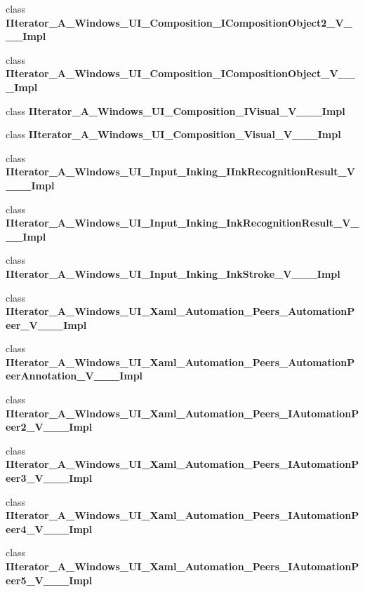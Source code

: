 \begin{DoxyCompactItemize}
\item 
class {\bfseries I\+Iterator\+\_\+\+A\+\_\+\+Windows\+\_\+\+U\+I\+\_\+\+Composition\+\_\+\+I\+Composition\+Object2\+\_\+\+V\+\_\+\+\_\+\+\_\+\+Impl}
\item 
class {\bfseries I\+Iterator\+\_\+\+A\+\_\+\+Windows\+\_\+\+U\+I\+\_\+\+Composition\+\_\+\+I\+Composition\+Object\+\_\+\+V\+\_\+\+\_\+\+\_\+\+Impl}
\item 
class {\bfseries I\+Iterator\+\_\+\+A\+\_\+\+Windows\+\_\+\+U\+I\+\_\+\+Composition\+\_\+\+I\+Visual\+\_\+\+V\+\_\+\+\_\+\+\_\+\+Impl}
\item 
class {\bfseries I\+Iterator\+\_\+\+A\+\_\+\+Windows\+\_\+\+U\+I\+\_\+\+Composition\+\_\+\+Visual\+\_\+\+V\+\_\+\+\_\+\+\_\+\+Impl}
\item 
class {\bfseries I\+Iterator\+\_\+\+A\+\_\+\+Windows\+\_\+\+U\+I\+\_\+\+Input\+\_\+\+Inking\+\_\+\+I\+Ink\+Recognition\+Result\+\_\+\+V\+\_\+\+\_\+\+\_\+\+Impl}
\item 
class {\bfseries I\+Iterator\+\_\+\+A\+\_\+\+Windows\+\_\+\+U\+I\+\_\+\+Input\+\_\+\+Inking\+\_\+\+Ink\+Recognition\+Result\+\_\+\+V\+\_\+\+\_\+\+\_\+\+Impl}
\item 
class {\bfseries I\+Iterator\+\_\+\+A\+\_\+\+Windows\+\_\+\+U\+I\+\_\+\+Input\+\_\+\+Inking\+\_\+\+Ink\+Stroke\+\_\+\+V\+\_\+\+\_\+\+\_\+\+Impl}
\item 
class {\bfseries I\+Iterator\+\_\+\+A\+\_\+\+Windows\+\_\+\+U\+I\+\_\+\+Xaml\+\_\+\+Automation\+\_\+\+Peers\+\_\+\+Automation\+Peer\+\_\+\+V\+\_\+\+\_\+\+\_\+\+Impl}
\item 
class {\bfseries I\+Iterator\+\_\+\+A\+\_\+\+Windows\+\_\+\+U\+I\+\_\+\+Xaml\+\_\+\+Automation\+\_\+\+Peers\+\_\+\+Automation\+Peer\+Annotation\+\_\+\+V\+\_\+\+\_\+\+\_\+\+Impl}
\item 
class {\bfseries I\+Iterator\+\_\+\+A\+\_\+\+Windows\+\_\+\+U\+I\+\_\+\+Xaml\+\_\+\+Automation\+\_\+\+Peers\+\_\+\+I\+Automation\+Peer2\+\_\+\+V\+\_\+\+\_\+\+\_\+\+Impl}
\item 
class {\bfseries I\+Iterator\+\_\+\+A\+\_\+\+Windows\+\_\+\+U\+I\+\_\+\+Xaml\+\_\+\+Automation\+\_\+\+Peers\+\_\+\+I\+Automation\+Peer3\+\_\+\+V\+\_\+\+\_\+\+\_\+\+Impl}
\item 
class {\bfseries I\+Iterator\+\_\+\+A\+\_\+\+Windows\+\_\+\+U\+I\+\_\+\+Xaml\+\_\+\+Automation\+\_\+\+Peers\+\_\+\+I\+Automation\+Peer4\+\_\+\+V\+\_\+\+\_\+\+\_\+\+Impl}
\item 
class {\bfseries I\+Iterator\+\_\+\+A\+\_\+\+Windows\+\_\+\+U\+I\+\_\+\+Xaml\+\_\+\+Automation\+\_\+\+Peers\+\_\+\+I\+Automation\+Peer5\+\_\+\+V\+\_\+\+\_\+\+\_\+\+Impl}

\end{DoxyCompactItemize}
